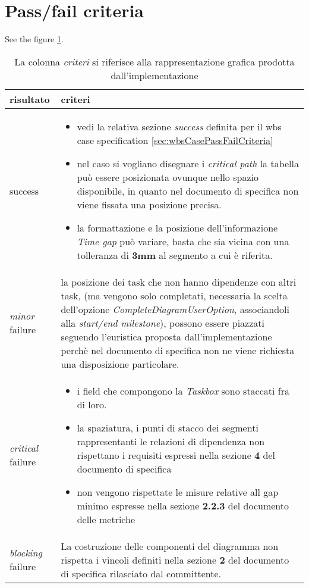 \section*{Pass/fail criteria}
See the figure \ref{table:passfailCriteriaGanttGeneration}.
\begin{table}[h!]
  \begin{center}
    \begin{tabular}{| l | p{100mm} |}
    \hline
    \textbf{risultato} & \textbf{criteri} \\
	\hline    
	success & 
    \begin{itemize}
  \item vedi la relativa sezione \emph{success} definita per il wbs case
  specification \ref{sec:wbsCasePassFailCriteria}
\item nel caso si vogliano disegnare i \emph{critical path} la tabella pu\`o
essere posizionata ovunque nello spazio disponibile, in quanto nel documento di
specifica non viene fissata una posizione precisa.
\item la formattazione e la posizione dell'informazione \emph{Time gap} pu\`o
variare, basta che sia vicina con una tolleranza di \textbf{3mm} al segmento a
cui \`e riferita.
\end{itemize}
\\
    \hline
    \emph{minor} failure & la posizione dei task che non hanno dipendenze con
    altri task, (ma vengono solo completati, necessaria la scelta dell'opzione
    \emph{CompleteDiagramUserOption}, associandoli alla \emph{start/end
    milestone}), possono essere piazzati seguendo l'euristica proposta
    dall'implementazione perch\`e nel documento di specifica non ne viene
    richiesta una disposizione particolare.
    \\
    \hline
    \emph{critical} failure & 
    \begin{itemize}
    \item i field che compongono la \emph{Taskbox} sono staccati fra di loro.
    \item la spaziatura, i punti di stacco dei segmenti rappresentanti le
    relazioni di dipendenza non rispettano i requisiti espressi nella sezione
   \textbf{4} del documento di specifica
    \item non vengono rispettate le misure relative all gap minimo espresse
    nella sezione \textbf{2.2.3} del documento delle metriche \end{itemize}\\
    \hline
    \emph{blocking} failure & La costruzione delle componenti del diagramma
    non rispetta i vincoli definiti nella sezione \textbf{2} del documento di 
   specifica rilasciato dal committente. \\
    \hline
    \end{tabular}
  \end{center}
	\caption{La colonna \emph{criteri} si riferisce alla rappresentazione grafica
	prodotta dall'implementazione}
	\label{table:passfailCriteriaGanttGeneration}
\end{table}
